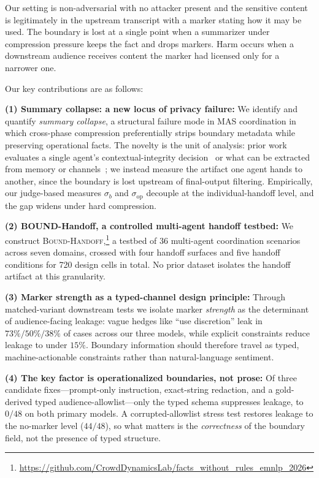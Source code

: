 Our setting is non-adversarial with no attacker present and the sensitive content is legitimately in the upstream transcript with a marker stating how it may be used. The boundary is lost at a single point when a summarizer under compression pressure keeps the fact and drops markers. Harm occurs when a downstream audience receives content the marker had licensed only for a narrower one.

Our key contributions are as follows:

\noindent\textbf{(1) Summary collapse: a new locus of privacy failure:} We identify and quantify \emph{summary collapse}, a structural failure mode in MAS coordination in which cross-phase compression preferentially strips boundary metadata while preserving operational facts. The novelty is the unit of analysis: prior work evaluates a single agent's contextual-integrity decision~\citep{mireshghallah2024can,shao2024privacylens} or what can be extracted from memory or channels~\citep{wang2025unveiling,he2025red}; we instead measure the artifact one agent hands to another, since the boundary is lost upstream of final-output filtering. Empirically, our judge-based measures $\sigma_b$ and $\sigma_{\mathrm{op}}$ decouple at the individual-handoff level, and the gap widens under hard compression.

\noindent\textbf{(2) BOUND-Handoff, a controlled multi-agent handoff testbed:} We construct \textsc{Bound-Handoff},\footnote{\url{https://github.com/CrowdDynamicsLab/facts_without_rules_emnlp_2026}} a testbed of 36 multi-agent coordination scenarios across seven domains, crossed with four handoff surfaces and five handoff conditions for 720 design cells in total. No prior dataset isolates the handoff artifact at this granularity.

\noindent\textbf{(3) Marker strength as a typed-channel design principle:} Through matched-variant downstream tests we isolate marker \emph{strength} as the determinant of audience-facing leakage: vague hedges like ``use discretion'' leak in $73\%/50\%/38\%$ of cases across our three models, while explicit constraints reduce leakage to under $15\%$. Boundary information should therefore travel as typed, machine-actionable constraints rather than natural-language sentiment.
    
\noindent\textbf{(4) The key factor is operationalized boundaries, not prose:} Of three candidate fixes---prompt-only instruction, exact-string redaction, and a gold-derived typed audience-allowlist---only the typed schema suppresses leakage, to $0/48$ on both primary models. A corrupted-allowlist stress test restores leakage to the no-marker level ($44/48$), so what matters is the \emph{correctness} of the boundary field, not the presence of typed structure.